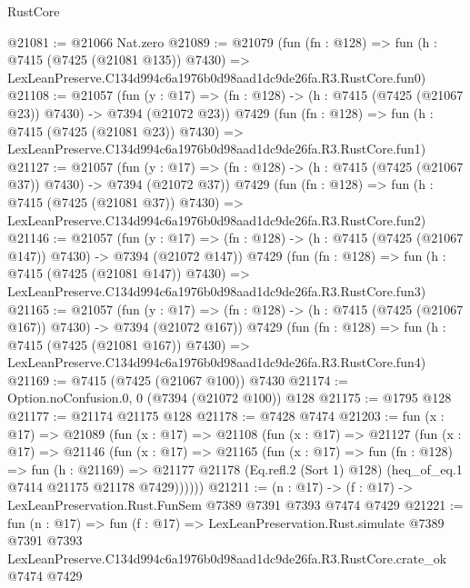 \begin{lexlean}{RustCore}
\begin{coremodule}
@21081 := @21066 Nat.zero
@21089 := @21079
    (fun (fn : @128) =>
    fun (h : @7415 (@7425 (@21081 @135)) @7430) =>
    LexLeanPreserve.C134d994c6a1976b0d98aad1dc9de26fa.R3.RustCore.fun0)
@21108 := @21057
    (fun (y : @17) => (fn : @128) -> (h : @7415 (@7425 (@21067 @23)) @7430) -> @7394 (@21072 @23))
    @7429
    (fun (fn : @128) =>
    fun (h : @7415 (@7425 (@21081 @23)) @7430) =>
    LexLeanPreserve.C134d994c6a1976b0d98aad1dc9de26fa.R3.RustCore.fun1)
@21127 := @21057
    (fun (y : @17) => (fn : @128) -> (h : @7415 (@7425 (@21067 @37)) @7430) -> @7394 (@21072 @37))
    @7429
    (fun (fn : @128) =>
    fun (h : @7415 (@7425 (@21081 @37)) @7430) =>
    LexLeanPreserve.C134d994c6a1976b0d98aad1dc9de26fa.R3.RustCore.fun2)
@21146 := @21057
    (fun (y : @17) => (fn : @128) -> (h : @7415 (@7425 (@21067 @147)) @7430) -> @7394 (@21072 @147))
    @7429
    (fun (fn : @128) =>
    fun (h : @7415 (@7425 (@21081 @147)) @7430) =>
    LexLeanPreserve.C134d994c6a1976b0d98aad1dc9de26fa.R3.RustCore.fun3)
@21165 := @21057
    (fun (y : @17) => (fn : @128) -> (h : @7415 (@7425 (@21067 @167)) @7430) -> @7394 (@21072 @167))
    @7429
    (fun (fn : @128) =>
    fun (h : @7415 (@7425 (@21081 @167)) @7430) =>
    LexLeanPreserve.C134d994c6a1976b0d98aad1dc9de26fa.R3.RustCore.fun4)
@21169 := @7415 (@7425 (@21067 @100)) @7430
@21174 := Option.noConfusion.{0, 0} (@7394 (@21072 @100)) @128
@21175 := @1795 @128
@21177 := @21174 @21175 @128
@21178 := @7428 @7474
@21203 := fun (x : @17) =>
  @21089
    (fun (x : @17) =>
    @21108
      (fun (x : @17) =>
      @21127
        (fun (x : @17) =>
        @21146
          (fun (x : @17) =>
          @21165
            (fun (x : @17) =>
            fun (fn : @128) =>
            fun (h : @21169) =>
            @21177 @21178 (Eq.refl.{2} (Sort 1) @128) (heq_of_eq.{1} @7414 @21175 @21178 @7429))))))
@21211 := (n : @17) -> (f : @17) -> LexLeanPreservation.Rust.FunSem @7389 @7391 @7393 @7474 @7429
@21221 := fun (n : @17) =>
  fun (f : @17) =>
  LexLeanPreservation.Rust.simulate
    @7389
    @7391
    @7393
    LexLeanPreserve.C134d994c6a1976b0d98aad1dc9de26fa.R3.RustCore.crate_ok
    @7474
    @7429
\end{coremodule}
\end{lexlean}
